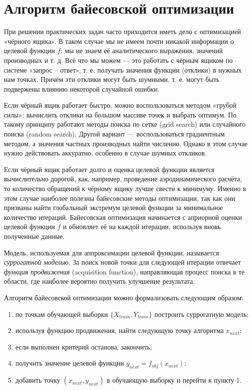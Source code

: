 \documentclass[11pt,a4paper]{article}
\providecommand{\tightlist}{%
      \setlength{\itemsep}{0pt}\setlength{\parskip}{0pt}}
\begin{document}
    \hypertarget{ux430ux43bux433ux43eux440ux438ux442ux43c-ux431ux430ux439ux435ux441ux43eux432ux441ux43aux43eux439-ux43eux43fux442ux438ux43cux438ux437ux430ux446ux438ux438}{%
\section{Алгоритм байесовской
оптимизации}\label{ux430ux43bux433ux43eux440ux438ux442ux43c-ux431ux430ux439ux435ux441ux43eux432ux441ux43aux43eux439-ux43eux43fux442ux438ux43cux438ux437ux430ux446ux438ux438}}

    При решении практических задач часто приходится иметь дело с
оптимизацией «чёрного ящика». В таком случае мы не имеем почти никакой
информации о целевой функции \(f\): мы не знаем её аналитического
выражения, значений производных и т. д. Всё что мы можем --- это
работать с чёрным ящиком по системе «запрос -- ответ», т. е. получать
значения функции (отклики) в нужных нам точках. Причём эти отклики могут
быть шумными, т. е. могут быть подвержены влиянию некоторой случайной
ошибки.

Если чёрный ящик работает быстро, можно воспользоваться методом «грубой
силы»: вычислить отклики на большом массиве точек и выбрать оптимум. По
такому принципу работают методы поиска по сетке (grid search) или
случайного поиска (random search). Другой вариант --- воспользоваться
градиентным методом, а значения частных производных найти численно.
Однако в этом случае нужно действовать аккуратно, особенно в случае
шумных откликов.

Если чёрный ящик работает долго и оценка целевой функции является
вычислительно дорогой, как, например, проведение аэродинамического
расчёта, то количество обращений к чёрному ящику лучше свести к
минимуму. Именно в этом случае наиболее полезны байесовские методы
оптимизации, так как они призваны найти глобальный экстремум целевой
функции за минимальное количество итераций. Байесовская оптимизация
начинается с априорной оценки целевой функции \(f\) и обновляет её на
каждой итерации, используя вновь полученные данные.

Модель, используемая для аппроксимации целевой функции, называется
\emph{суррогатной моделью}. За поиск новой точки для следующей итерации
отвечает \emph{функция продвижения} (acquisition function), направляющая
процесс поиска в те области, где наиболее вероятно получить улучшение
результата.

    Алгоритм байесовской оптимизации можно формализовать следующим образом:

\begin{enumerate}
\def\labelenumi{\arabic{enumi}.}
\tightlist
\item
  по точкам обучающей выборки \(\{X_{train}, Y_{train}\}\) построить
  суррогатную модель;
\item
  используя функцию продвижения, найти следующую точку алгоритма
  \(x_{next}\);
\item
  если выполнен критерий останова, закончить;
\item
  получить значение целевой функции \(y_{next} = f_{obj}(x_{next})\);
\item
  добавить точку \((x_{next}, y_{next})\) в обучающую выборку и перейти
  к пункту 1.
\end{enumerate}
\end{document}
